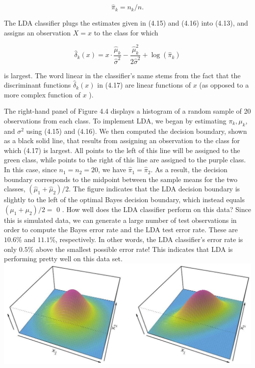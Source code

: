 \documentclass[10pt]{article}
\begin{document}
\begin{equation*}
\hat{\pi}_{k}=n_{k} / n . \tag{4.16}
\end{equation*}


The LDA classifier plugs the estimates given in (4.15) and (4.16) into (4.13), and assigns an observation $X=x$ to the class for which


\begin{equation*}
\hat{\delta}_{k}(x)=x \cdot \frac{\hat{\mu}_{k}}{\hat{\sigma}^{2}}-\frac{\hat{\mu}_{k}^{2}}{2 \hat{\sigma}^{2}}+\log \left(\hat{\pi}_{k}\right) \tag{4.17}
\end{equation*}


is largest. The word linear in the classifier's name stems from the fact that the discriminant functions $\hat{\delta}_{k}(x)$ in (4.17) are linear functions of $x$ (as opposed to a more complex function of $x$ ).

The right-hand panel of Figure 4.4 displays a histogram of a random sample of 20 observations from each class. To implement LDA, we began by estimating $\pi_{k}, \mu_{k}$, and $\sigma^{2}$ using (4.15) and (4.16). We then computed the decision boundary, shown as a black solid line, that results from assigning an observation to the class for which (4.17) is largest. All points to the left of this line will be assigned to the green class, while points to the right of this line are assigned to the purple class. In this case, since $n_{1}=n_{2}=20$, we have $\hat{\pi}_{1}=\hat{\pi}_{2}$. As a result, the decision boundary corresponds to the midpoint between the sample means for the two classes, $\left(\hat{\mu}_{1}+\hat{\mu}_{2}\right) / 2$. The figure indicates that the LDA decision boundary is slightly to the left of the optimal Bayes decision boundary, which instead equals $\left(\mu_{1}+\mu_{2}\right) / 2=$ 0 . How well does the LDA classifier perform on this data? Since this is simulated data, we can generate a large number of test observations in order to compute the Bayes error rate and the LDA test error rate. These are $10.6 \%$ and $11.1 \%$, respectively. In other words, the LDA classifier's error rate is only $0.5 \%$ above the smallest possible error rate! This indicates that LDA is performing pretty well on this data set.\\
\includegraphics[max width=\textwidth, center]{2025_05_05_efe77898333945044de4g-157}
\end{document}

